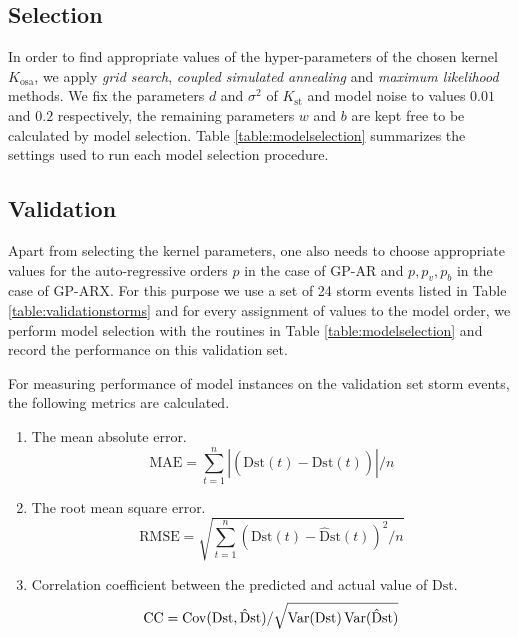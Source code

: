 \subsection*{Selection}

In order to find appropriate values of the hyper-parameters of the chosen kernel $K_{\text{osa}}$, we apply 
\emph{grid search}, \emph{coupled simulated annealing} and \emph{maximum likelihood} methods. We fix the parameters 
$d$ and $\sigma^2$ of $K_{\text{st}}$ and model noise to values $0.01$ and $0.2$ respectively, the remaining 
parameters $w$ and $b$ are kept free to be calculated by model selection. Table \ref{table:modelselection} 
summarizes the settings used to run each model selection procedure.

\subsection*{Validation}

Apart from selecting the kernel parameters, one also needs to choose appropriate values for the auto-regressive orders $p$ in the case of GP-AR and $p, p_v, p_b$ in the case of GP-ARX. For this purpose we use a set of 24 storm events listed in Table \ref{table:validationstorms} and for every assignment of values to the model order, we perform model selection with the routines in Table \ref{table:modelselection} and record the performance on this validation set.

For measuring performance of model instances on the validation set storm events, the following metrics are calculated.

\begin{enumerate}
    \item The mean absolute error.
    \begin{equation}
        \mathrm{MAE} = \sum_{t=1}^{n} \left |(\mathrm{Dst}(t) - \mathrm{\hat{D}st}(t)) \right | / n
    \end{equation}
    \item The root mean square error.
    \begin{equation}
        \mathrm{RMSE} = \sqrt{\sum_{t=1}^{n} (\mathrm{Dst}(t) - \mathrm{\hat{D}st}(t))^2 / n}
    \end{equation}
    \item Correlation coefficient between the predicted and actual value of $ \mathrm{Dst}$.
    \begin{equation}
        \mathrm{CC} = \operatorname*{Cov}(\mathrm{Dst}, \mathrm{\hat{D}st})/\sqrt{\operatorname*{Var}(\mathrm{Dst}) \operatorname*{Var}(\mathrm{\hat{D}st})}
    \end{equation}
\end{enumerate}



